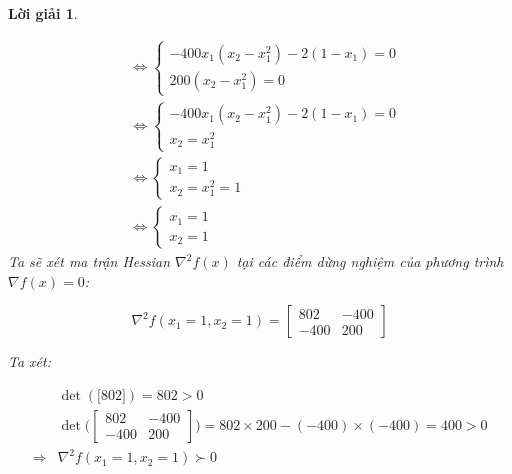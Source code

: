 \documentclass[14pt, a4paper]{article}
\theoremstyle{sltheorem}
\theoremstyle{soltheorem}
\newtheorem*{loigiai}{Lời giải}
\begin{document}
\begin{loigiai}
\begin{enumerate} [wide, labelwidth=!, labelindent=0pt,label=\textbf{\arabic*}.]
            \begin{equation*}
                \begin{aligned}
                    &\Leftrightarrow\begin{cases} -400x_1(x_2 - x_1^2) -2(1-x_1) = 0 \\ 200(x_2 - x_1^2) = 0 \end{cases} \\
                    &\Leftrightarrow \begin{cases} -400x_1(x_2 - x_1^2) -2(1-x_1) = 0 \\ x_2 = x_1^2 \end{cases} \\
                    &\Leftrightarrow \begin{cases} x_1=1 \\ x_2 = x_1^2=1 \end{cases} \\
                    &\Leftrightarrow \begin{cases} x_1=1 \\ x_2=1 \end{cases}
                \end{aligned}
            \end{equation*}
            Ta sẽ xét ma trận Hessian $\nabla^2 f(x)$ tại các điểm dừng nghiệm của phương trình $\nabla f(x) = 0$:

            \begin{equation*}
                \nabla^2 f(x_1=1, x_2=1)=\begin{bmatrix} 802 & -400 \\ -400 & 200 \end{bmatrix}
            \end{equation*}

            Ta xét:

            \begin{equation*}
                \begin{aligned}
                    &\det(\lbrack 802 \rbrack)=802>0 \\
                    &\det{\Big(\begin{bmatrix} 802 & -400 \\ -400 & 200 \end{bmatrix} \Big)}=802\times200 - (-400)\times(-400)=400>0 \\
                    \Rightarrow&\nabla^2 f(x_1=1, x_2=1) \succ 0
                \end{aligned}
            \end{equation*}


\end{enumerate}
\end{loigiai}
\end{document}
